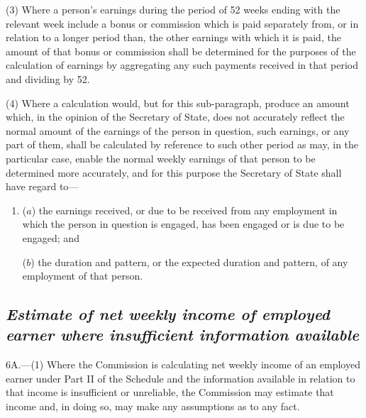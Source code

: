 \documentclass[12pt,a4paper]{article}
\begin{document}
(3) Where a person’s earnings during the period of 52 weeks ending with the relevant week include a bonus or commission 
which is paid separately from, or in relation to a longer period than, the other earnings with which it is paid, the amount of that bonus or commission shall be determined for the purposes of the calculation of earnings by aggregating any such payments received in that period and dividing by 52.

(4) Where a calculation would, but for this sub-paragraph, produce an amount which, in the opinion of the Secretary of State, does not accurately reflect the normal amount of the earnings of the person in question, such earnings, or any part of them, shall be calculated by reference to such other period as may, in the particular case, enable the normal weekly earnings of that person to be determined more accurately, and for this purpose the Secretary of State shall have regard to—
\begin{enumerate}\item[]
($a$) the earnings received, or due to be received from any employment in which the person in question is engaged, has been engaged or is due to be engaged; and

($b$) the duration and pattern, or the expected duration and pattern, of any employment of that person.
\end{enumerate}


\subsection*{\sloppy\itshape Estimate of net weekly income of employed earner where insufficient information available}

6A.---(1)  Where the Commission is calculating net weekly income of an employed earner under Part II of the Schedule and the information available in relation to that income is insufficient or unreliable, the Commission may estimate that income and, in doing so, may make any assumptions as to any fact.
\end{document}
